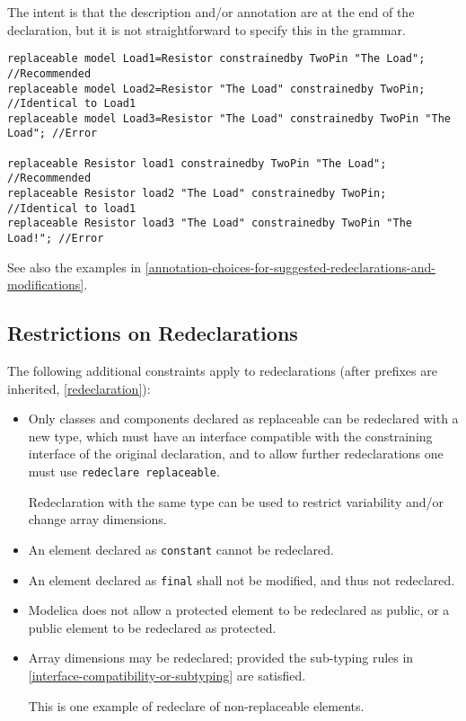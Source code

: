 \begin{nonnormative}
The intent is that the description and/or annotation are at the end of the declaration, but it is not straightforward to specify this in the grammar.
\end{nonnormative}

\begin{example}
\begin{lstlisting}[language=modelica]
replaceable model Load1=Resistor constrainedby TwoPin "The Load"; //Recommended
replaceable model Load2=Resistor "The Load" constrainedby TwoPin; //Identical to Load1
replaceable model Load3=Resistor "The Load" constrainedby TwoPin "The Load"; //Error

replaceable Resistor load1 constrainedby TwoPin "The Load"; //Recommended
replaceable Resistor load2 "The Load" constrainedby TwoPin; //Identical to load1
replaceable Resistor load3 "The Load" constrainedby TwoPin "The Load!"; //Error
\end{lstlisting}
\end{example}

See also the examples in \cref{annotation-choices-for-suggested-redeclarations-and-modifications}.

\subsection{Restrictions on Redeclarations}\label{restrictions-on-redeclarations}

The following additional constraints apply to redeclarations (after
prefixes are inherited, \cref{redeclaration}):
\begin{itemize}
\item
  Only classes and components declared as replaceable can be redeclared with a new type, which must have an interface compatible with the constraining
  interface of the original declaration, and to allow further redeclarations one must use \lstinline!redeclare replaceable!.
  \begin{nonnormative}
  Redeclaration with the same type can be used to restrict variability and/or change array dimensions.
  \end{nonnormative}
\item
  An element declared as \lstinline!constant! cannot be redeclared.
\item
  An element declared as \lstinline!final! shall not be modified, and thus not redeclared.
\item
  Modelica does not allow a protected element to be redeclared as public, or a public element to be redeclared as protected.
\item
  Array dimensions may be redeclared; provided the sub-typing rules in \cref{interface-compatibility-or-subtyping} are satisfied.
  \begin{nonnormative}
  This is one example of redeclare of non-replaceable elements.
  \end{nonnormative}
\end{itemize}

